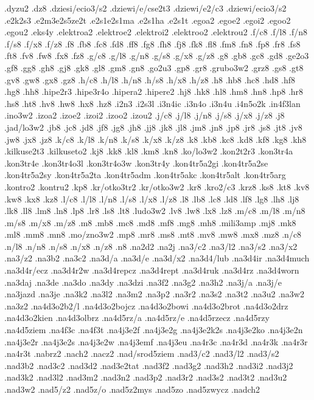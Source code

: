 {.dyzu2
.dz8
.dziesi/ecio3/s2
.dziewi/e/cse2t3
.dziewi/e2/c3
.dziewi/ecio3/s2
.e2k2s3
.e2m3e2s5ze2t
.e2s1e2s1ma
.e2s1ha
.e2s1t
.egoa2
.egoe2
.egoi2
.egoo2
.egou2
.eks4y
.elektroa2
.elektroe2
.elektroi2
.elektroo2
.elektrou2
.f/c8
.f/l8
.f/n8
.f/s8
.f/x8
.f/z8
.f8
.fb8
.fc8
.fd8
.ff8
.fg8
.fh8
.fj8
.fk8
.fl8
.fm8
.fn8
.fp8
.fr8
.fs8
.ft8
.fv8
.fw8
.fx8
.fz8
.g/c8
.g/l8
.g/n8
.g/s8
.g/x8
.g/z8
.g8
.gb8
.gc8
.gd8
.ge2o3
.gf8
.gg8
.gh8
.gj8
.gk8
.gl8
.gm8
.gn8
.go2u3
.gp8
.gr8
.grubo3w2
.grz8
.gs8
.gt8
.gv8
.gw8
.gx8
.gz8
.h/c8
.h/l8
.h/n8
.h/s8
.h/x8
.h/z8
.h8
.hb8
.hc8
.hd8
.hf8
.hg8
.hh8
.hipe2r3
.hipe3r4o
.hipera2
.hipere2
.hj8
.hk8
.hl8
.hm8
.hn8
.hp8
.hr8
.hs8
.ht8
.hv8
.hw8
.hx8
.hz8
.i2n3
.i2s3l
.i3n4ic
.i3n4o
.i3n4u
.i4n5o2k
.in4f3lan
.ino3w2
.izoa2
.izoe2
.izoi2
.izoo2
.izou2
.j/c8
.j/l8
.j/n8
.j/s8
.j/x8
.j/z8
.j8
.jad/lo3w2
.jb8
.jc8
.jd8
.jf8
.jg8
.jh8
.jj8
.jk8
.jl8
.jm8
.jn8
.jp8
.jr8
.js8
.jt8
.jv8
.jw8
.jx8
.jz8
.k/c8
.k/l8
.k/n8
.k/s8
.k/x8
.k/z8
.k8
.kb8
.kc8
.kd8
.kf8
.kg8
.kh8
.kilkuse2t3
.kilkuseto2
.kj8
.kk8
.kl8
.km8
.kn8
.ko/lo3w2
.kon2t2r3
.kon3tr4a
.kon3tr4e
.kon3tr4o3l
.kon3tr4o3w
.kon3tr4y
.kon4tr5a2gi
.kon4tr5a2se
.kon4tr5a2sy
.kon4tr5a2ta
.kon4tr5adm
.kon4tr5akc
.kon4tr5alt
.kon4tr5arg
.kontro2
.kontru2
.kp8
.kr/otko3tr2
.kr/otko3w2
.kr8
.kro2/c3
.krz8
.ks8
.kt8
.kv8
.kw8
.kx8
.kz8
.l/c8
.l/l8
.l/n8
.l/s8
.l/x8
.l/z8
.l8
.lb8
.lc8
.ld8
.lf8
.lg8
.lh8
.lj8
.lk8
.ll8
.lm8
.ln8
.lp8
.lr8
.ls8
.lt8
.ludo3w2
.lv8
.lw8
.lx8
.lz8
.m/c8
.m/l8
.m/n8
.m/s8
.m/x8
.m/z8
.m8
.mb8
.mc8
.md8
.mf8
.mg8
.mh8
.mili3amp
.mj8
.mk8
.ml8
.mm8
.mn8
.mo/zno3w2
.mp8
.mr8
.ms8
.mt8
.mv8
.mw8
.mx8
.mz8
.n/c8
.n/l8
.n/n8
.n/s8
.n/x8
.n/z8
.n8
.na2d2
.na2j
.na3/c2
.na3/l2
.na3/s2
.na3/x2
.na3/z2
.na3b2
.na3c2
.na3d/a
.na3d/e
.na3d/x2
.na3d4/lub
.na3d4ir
.na3d4much
.na3d4r/ecz
.na3d4r2w
.na3d4repcz
.na3d4rept
.na3d4ruk
.na3d4rz
.na3d4worn
.na3daj
.na3de
.na3do
.na3dy
.na3dzi
.na3f2
.na3g2
.na3h2
.na3j/a
.na3j/e
.na3jazd
.na3je
.na3k2
.na3l2
.na3m2
.na3p2
.na3r2
.na3s2
.na3t2
.na3u2
.na3w2
.na3z2
.na4d3o2b2/l
.na4d3o2bojcz
.na4d3o2bowi
.na4d3o2brot
.na4d3o2drz
.na4d3o2kien
.na4d3olbrz
.na4d5rz/a
.na4d5rz/e
.na4d5rzecz
.na4d5rzy
.na4d5ziem
.na4f3c
.na4f3t
.na4j3e2f
.na4j3e2g
.na4j3e2k2s
.na4j3e2ko
.na4j3e2n
.na4j3e2r
.na4j3e2s
.na4j3e2w
.na4j3emf
.na4j3eu
.na4r3c
.na4r3d
.na4r3k
.na4r3r
.na4r3t
.nabrz2
.nach2
.nacz2
.nad/srod5ziem
.nad3/c2
.nad3/l2
.nad3/s2
.nad3b2
.nad3c2
.nad3d2
.nad3e2tat
.nad3f2
.nad3g2
.nad3h2
.nad3i2
.nad3j2
.nad3k2
.nad3l2
.nad3m2
.nad3n2
.nad3p2
.nad3r2
.nad3s2
.nad3t2
.nad3u2
.nad3w2
.nad5/z2
.nad5z/o
.nad5z2mys
.nad5zo
.nad5zwycz
.nadch2
}
